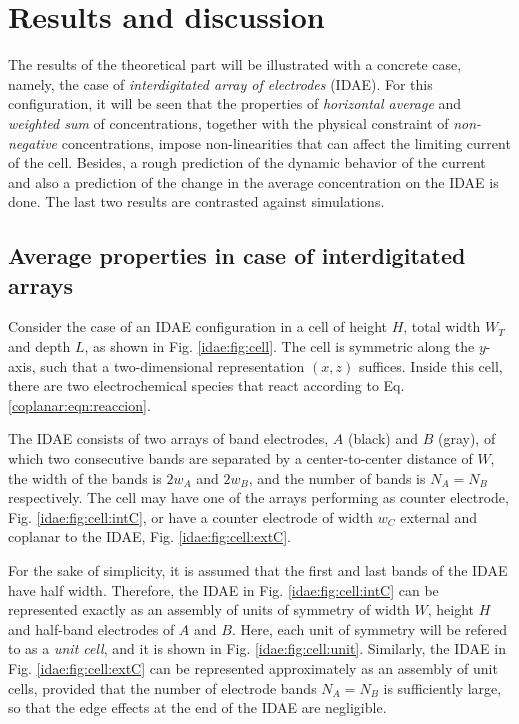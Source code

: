 

\section{Results and discussion}

The results of the theoretical part will be illustrated with a concrete case,
namely, the case of \emph{interdigitated array of electrodes} (IDAE).
For this configuration, it will be seen that the properties of
\emph{horizontal average} and \emph{weighted sum} of concentrations,
together with the physical constraint of \emph{non-negative} concentrations,
impose non-linearities that can affect the limiting current of the cell.
Besides, a rough prediction of the dynamic behavior of the current
and also a prediction of the change in the average concentration on the IDAE is done.
The last two results are contrasted against simulations.


\subsection{Average properties in case of interdigitated arrays}
\label{idae:promedios}

Consider the case of an IDAE configuration
in a cell of height $H$, total width $W_{T}$ and depth $L$,
as shown in Fig. \ref{idae:fig:cell}.
The cell is symmetric along the $y$-axis,
such that a two-dimensional representation $(x,z)$ suffices.
Inside this cell, there are two electrochemical species that react according to Eq. \eqref{coplanar:eqn:reaccion}.

The IDAE consists of two arrays of band electrodes, $A$ (black) and $B$ (gray),
of which two consecutive bands are separated by a center-to-center distance of $W$,
the width of the bands is $2w_{A}$ and $2w_{B}$,
and the number of bands is $N_{A} = N_{B}$ respectively.
The cell may have one of the arrays performing as counter electrode, Fig. \ref{idae:fig:cell:intC},
or have a counter electrode  of width $w_{C}$ external and coplanar to the IDAE, Fig. \ref{idae:fig:cell:extC}.

For the sake of simplicity,
it is assumed that the first and last bands of the IDAE have half width.
Therefore, the IDAE in Fig. \ref{idae:fig:cell:intC} can be represented exactly
as an assembly of units of symmetry of width $W$, height $H$ and half-band electrodes of $A$ and $B$.
Here, each unit of symmetry will be refered to as a \emph{unit cell},
and it is shown in Fig. \ref{idae:fig:cell:unit}.
Similarly, the IDAE in Fig. \ref{idae:fig:cell:extC} can be represented approximately as an assembly of unit cells,
provided that the number of electrode bands $N_{A} = N_{B}$ is sufficiently large,
so that the edge effects at the end of the IDAE are negligible.


